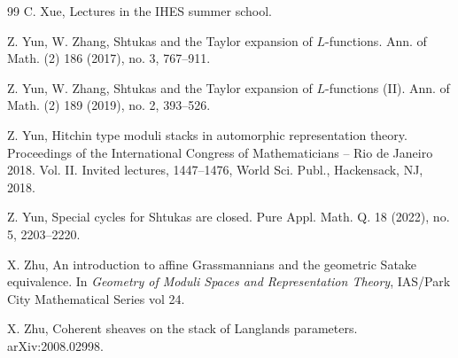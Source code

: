 \documentclass[11pt]{amsart}
\numberwithin{equation}{section}
\theoremstyle{plain}
\theoremstyle{definition}
\begin{document}
\begin{thebibliography}{99}
C. Xue,
Lectures in the IHES summer school.


Z. Yun, W. Zhang, 
Shtukas and the Taylor expansion of $L$-functions. 
Ann. of Math. (2) 186 (2017), no. 3, 767--911.

Z. Yun, W. Zhang, 
Shtukas and the Taylor expansion of $L$-functions (II). 
Ann. of Math. (2) 189 (2019), no. 2, 393--526. 


Z. Yun, 
Hitchin type moduli stacks in automorphic representation theory. 
Proceedings of the International Congress of Mathematicians -- Rio de Janeiro 2018. Vol. II. Invited lectures, 1447--1476, World Sci. Publ.,
Hackensack, NJ, 2018.

Z. Yun,
Special cycles for Shtukas are closed.
Pure Appl. Math. Q. 18 (2022), no. 5, 2203--2220.


X. Zhu, 
An introduction to affine Grassmannians and the geometric Satake equivalence.
In {\em Geometry of Moduli Spaces and Representation Theory}, IAS/Park City Mathematical Series vol 24.

X. Zhu,
Coherent sheaves on the stack of Langlands parameters.
arXiv:2008.02998.



\end{thebibliography}
\end{document}
